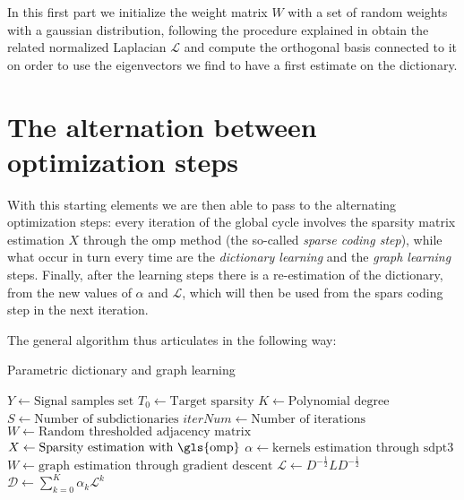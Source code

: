 In this first part we initialize the weight matrix $W$ with a set of random weights with a gaussian distribution, following the procedure explained in \cite{Kalofolias2016} obtain the related normalized Laplacian $\mathcal{L}$ and compute the orthogonal basis connected to it on order to use the eigenvectors we find to have a first estimate on the dictionary.

\section{The alternation between optimization steps}
With this starting elements we are then able to pass to the alternating optimization steps: every iteration of the global cycle involves the sparsity matrix estimation $X$ through the \gls{omp} method (the so-called \textit{sparse coding step}), while what occur in turn every time are the \textit{dictionary learning} and the \textit{graph learning} steps. Finally, after the learning steps there is a re-estimation of the dictionary, from the new values of $\alpha$ and $\mathcal{L}$, which will then be used from the spars coding step in the next iteration.

The general algorithm thus articulates in the following way:

\begin{algorithm}[H]
  \caption{Parametric dictionary and graph learning}
  \begin{algorithmic}[1]
      \State $Y \gets \text{Signal samples set}$
      \State $T_0\gets \text{Target sparsity}$
      \State $K \gets \text{Polynomial degree}$
      \State $S \gets \text{Number of subdictionaries}$
      \State $iterNum \gets \text{Number of iterations}$
      \State $W \gets \text{Random thresholded adjacency matrix}$
    \EndProcedure
        \State $X \gets \text{Sparsity estimation with \gls{omp}}$
      \EndProcedure
         \label{5}
          \State $\alpha \gets \text{kernels estimation through sdpt3}$
        \Else
          \State $W \gets \text{graph estimation through gradient descent}$
          \State $\mathcal{L} \gets D^{-\frac{1}{2}}LD^{-\frac{1}{2}}$
        \EndIf
      \EndProcedure
        \State $\mathcal{D} \gets \sum_{k=0}^K \alpha_k \mathcal{L}^k$
      \EndProcedure
    \EndFor
    \end{algorithmic}
\end{algorithm}

